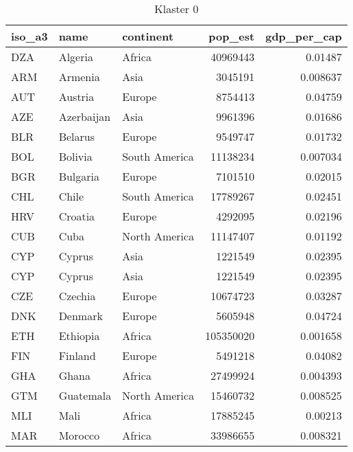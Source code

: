 \begin{table}[h!]
   \centering
   \caption{Klaster 0}
   \label{tab:cl0}
   \begin{tabular}{lllrr}
      \toprule
      iso\_a3 & name         & continent     & pop\_est  & gdp\_per\_cap \\
      \midrule
      DZA     & Algeria      & Africa        & 40969443  & 0.01487       \\
      ARM     & Armenia      & Asia          & 3045191   & 0.008637      \\
      AUT     & Austria      & Europe        & 8754413   & 0.04759       \\
      AZE     & Azerbaijan   & Asia          & 9961396   & 0.01686       \\
      BLR     & Belarus      & Europe        & 9549747   & 0.01732       \\
      BOL     & Bolivia      & South America & 11138234  & 0.007034      \\
      BGR     & Bulgaria     & Europe        & 7101510   & 0.02015       \\
      CHL     & Chile        & South America & 17789267  & 0.02451       \\
      HRV     & Croatia      & Europe        & 4292095   & 0.02196       \\
      CUB     & Cuba         & North America & 11147407  & 0.01192       \\
      CYP     & Cyprus       & Asia          & 1221549   & 0.02395       \\
      CYP     & Cyprus       & Asia          & 1221549   & 0.02395       \\
      CZE     & Czechia      & Europe        & 10674723  & 0.03287       \\
      DNK     & Denmark      & Europe        & 5605948   & 0.04724       \\
      ETH     & Ethiopia     & Africa        & 105350020 & 0.001658      \\
      FIN     & Finland      & Europe        & 5491218   & 0.04082       \\
      GHA     & Ghana        & Africa        & 27499924  & 0.004393      \\
      GTM     & Guatemala    & North America & 15460732  & 0.008525      \\
      MLI     & Mali         & Africa        & 17885245  & 0.00213       \\
      MAR     & Morocco      & Africa        & 33986655  & 0.008321      \\

\end{tabular}
\end{table}
